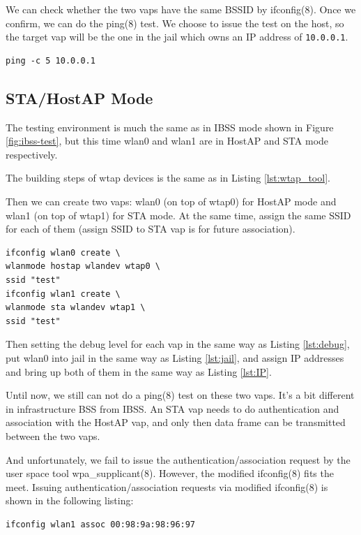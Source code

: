 \documentclass[conference]{IEEEtran}
\begin{document}
We can check whether the two vaps have the same BSSID by ifconfig(8). Once we confirm, we can do the ping(8) test. We choose to issue the test on the host, so the target vap will be the one in the jail which owns an IP address of \lstinline{10.0.0.1}.

\begin{lstlisting}[caption=Ping(8) test, label={lst:ping}]
ping -c 5 10.0.0.1
\end{lstlisting}

\subsection{STA/HostAP Mode}
The testing environment is much the same as in IBSS mode shown in Figure \ref{fig:ibss-test}, but this time wlan0 and wlan1 are in HostAP and STA mode respectively.

The building steps of wtap devices is the same as in Listing \ref{lst:wtap_tool}.

Then we can create two vaps: wlan0 (on top of wtap0) for HostAP mode and wlan1 (on top of wtap1) for STA mode. At the same time, assign the same SSID for each of them (assign SSID to STA vap is for future association).

\begin{lstlisting}
ifconfig wlan0 create \
wlanmode hostap wlandev wtap0 \
ssid "test"
ifconfig wlan1 create \
wlanmode sta wlandev wtap1 \
ssid "test"
\end{lstlisting}

Then setting the debug level for each vap in the same way as Listing \ref{lst:debug}, put wlan0 into jail in the same way as Listing \ref{lst:jail}, and assign IP addresses and bring up both of them in the same way as Listing \ref{lst:IP}.

Until now, we still can not do a ping(8) test on these two vaps. It's a bit different in infrastructure BSS from IBSS. An STA vap needs to do authentication and association with the HostAP vap, and only then data frame can be transmitted between the two vaps. 

And unfortunately, we fail to issue the authentication/association request by the user space tool wpa\_supplicant(8). However, the modified ifconfig(8) \cite{commit:mlme} fits the meet. Issuing authentication/association requests via modified ifconfig(8) is shown in the following listing:

\begin{lstlisting}
ifconfig wlan1 assoc 00:98:9a:98:96:97
\end{lstlisting}
\end{document}
